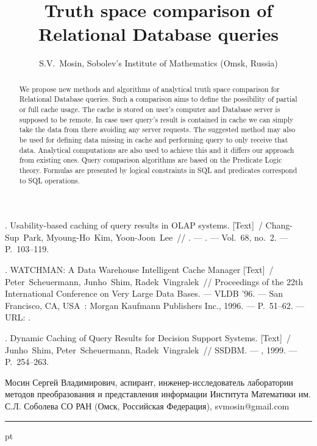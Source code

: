 \documentclass{cmi}
\begin{document}
\begin{biblio}
	. Usability-based caching of query results in OLAP
	systems. [Text]~/ Chang-Sup~Park, Myoung-Ho~Kim, Yoon-Joon~Lee~//
	. ---
	. ---
	\newblock Vol.~68, no.~2. ---
	\newblock P.~103--119.
	
	. WATCHMAN: A Data Warehouse Intelligent Cache
	Manager [Text]~/ Peter~Scheuermann, Junho~Shim, Radek~Vingralek~//
	Proceedings of the 22th International Conference on Very Large Data Bases.
	---
	\newblock VLDB '96. ---
	\newblock San Francisco, CA, USA~: Morgan Kaufmann Publishers Inc., 1996. ---
	\newblock P.~51--62. ---
	\newblock URL: .
	
	. Dynamic Caching of Query Results for Decision Support
	Systems. [Text]~/ Junho~Shim, Peter~Scheuermann, Radek~Vingralek~// SSDBM.
	---
	\newblock [S.\ l.~: s.\ n.], 1999. ---
	\newblock P.~254--263.
\end{biblio}

{Мосин Сергей Владимирович,
аспирант,
инженер-исследователь лаборатории методов преобразования и представления информации Института Математики им. С.Л. Соболева СО РАН (Омск, Российская Федерация),
svmosin@gmail.com}

{\phantom{eee} \hrule {} pt}
\classify{} %
\author{S.V.~Mosin, {\rm  Sobolev's Institute of Mathematics (Omsk, Russia)}}
\title{Truth space comparison of Relational Database queries}
\maketitle{}

\begin{abstract}%
We propose new methods and algorithms of analytical truth space comparison for Relational Database queries.
Such a comparison aims to define the possibility of partial or full cache usage. The cache is stored on
user's computer and Database server is supposed to be remote. In case user query's result is contained in
cache we can simply take the data from there avoiding any server requests. The suggested method may also be
used for defining data missing in cache and performing query to only receive that data. Analytical
computations are also used to achieve this and it differs our approach from existing ones. Query comparison
algorithms are based on the Predicate Logic theory. Formulas are presented by logical constraints in SQL
and predicates correspond to SQL operations.

\end{abstract}
\end{document}
